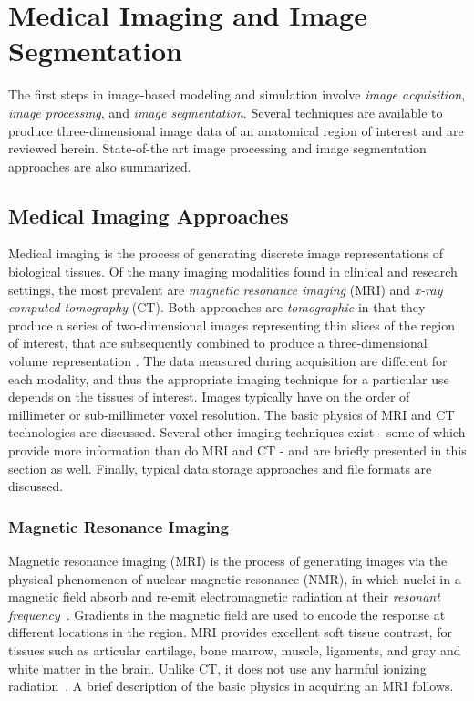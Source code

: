 \chapter{Medical Imaging and Image Segmentation}
\label{chap:2}
%

The first steps in image-based modeling and simulation involve \textit{image acquisition}, \textit{image processing}, and \textit{image segmentation}. Several techniques are available to produce three-dimensional image data of an anatomical region of interest and are reviewed herein. State-of-the art image processing and image segmentation approaches are also summarized.

\section{Medical Imaging Approaches}
\label{Medical Imaging Approaches}

Medical imaging is the process of generating discrete image representations of biological tissues. Of the many imaging modalities found in clinical and research settings, the most prevalent are \textit{magnetic resonance imaging} (MRI) and \textit{x-ray computed tomography} (CT). Both approaches are \textit{tomographic} in that they produce a series of two-dimensional images representing thin slices of the region of interest, that are subsequently combined to produce a three-dimensional volume representation \cite{larobina_murino_2014}. The data measured during acquisition are different for each modality, and thus the appropriate imaging technique for a particular use depends on the tissues of interest. Images typically have on the order of millimeter or sub-millimeter voxel resolution. The basic physics of MRI and CT technologies are discussed. Several other imaging techniques exist - some of which provide more information than do MRI and CT - and are briefly presented in this section as well. Finally, typical data storage approaches and file formats are discussed.

\subsection{Magnetic Resonance Imaging}
\label{Magnetic Resonance Imaging}

Magnetic resonance imaging (MRI) is the process of generating images via the physical phenomenon of nuclear magnetic resonance (NMR), in which nuclei in a magnetic field absorb and re-emit electromagnetic radiation at their \textit{resonant frequency}~\cite{NMR}. Gradients in the magnetic field are used to encode the response at different locations in the region. MRI provides excellent soft tissue contrast, for tissues such as articular cartilage, bone marrow, muscle, ligaments, and gray and white matter in the brain. Unlike CT, it does not use any harmful ionizing radiation~\cite{waldman_campbell}. A brief description of the basic physics in acquiring an MRI follows.


